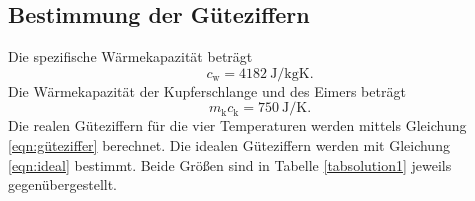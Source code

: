 \subsection{Bestimmung der Güteziffern}
Die spezifische Wärmekapazität \cite{wiki} beträgt
\begin{equation*}
    c_\text{w} = \SI{4182}{\joule\per\kilo\gram\kelvin}.
\end{equation*}
Die Wärmekapazität der Kupferschlange und des Eimers beträgt
\begin{equation*}
    m_\text{k} c_\text{k} = \SI{750}{\joule\per\kelvin}.
\end{equation*}
Die realen Güteziffern für die vier Temperaturen werden mittels
Gleichung \eqref{eqn:güteziffer} berechnet. %
Die idealen Güteziffern werden mit Gleichung \eqref{eqn:ideal} %
bestimmt.
Beide Größen sind in Tabelle \ref{tabsolution1} jeweils
gegenübergestellt.


